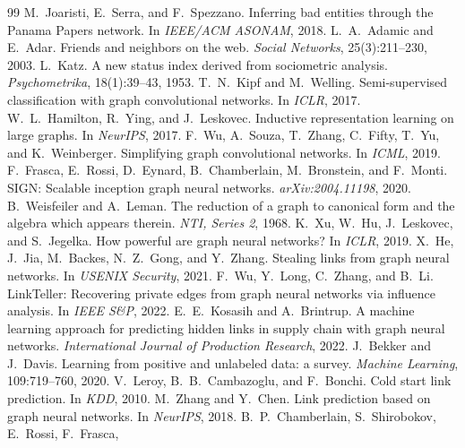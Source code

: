 \documentclass[sigconf]{acmart}
\begin{document}
\begin{thebibliography}{99}
 M.~Joaristi, E.~Serra, and F.~Spezzano.
\newblock Inferring bad entities through the Panama Papers network.
\newblock In \emph{IEEE/ACM ASONAM}, 2018.
 L.~A.~Adamic and E.~Adar.
\newblock Friends and neighbors on the web.
\newblock \emph{Social Networks}, 25(3):211--230, 2003.
 L.~Katz.
\newblock A new status index derived from sociometric analysis.
\newblock \emph{Psychometrika}, 18(1):39--43, 1953.
 T.~N.~Kipf and M.~Welling.
\newblock Semi-supervised classification with graph convolutional networks.
\newblock In \emph{ICLR}, 2017.
 W.~L.~Hamilton, R.~Ying, and J.~Leskovec.
\newblock Inductive representation learning on large graphs.
\newblock In \emph{NeurIPS}, 2017.
 F.~Wu, A.~Souza, T.~Zhang, C.~Fifty, T.~Yu, and K.~Weinberger.
\newblock Simplifying graph convolutional networks.
\newblock In \emph{ICML}, 2019.
 F.~Frasca, E.~Rossi, D.~Eynard, B.~Chamberlain, M.~Bronstein,
and F.~Monti.
\newblock SIGN: Scalable inception graph neural networks.
\newblock \emph{arXiv:2004.11198}, 2020. %
 B.~Weisfeiler and A.~Leman.
\newblock The reduction of a graph to canonical form and the algebra which
appears therein.
\newblock \emph{NTI, Series 2}, 1968.
 K.~Xu, W.~Hu, J.~Leskovec, and S.~Jegelka.
\newblock How powerful are graph neural networks?
\newblock In \emph{ICLR}, 2019.
 X.~He, J.~Jia, M.~Backes, N.~Z.~Gong, and Y.~Zhang.
\newblock Stealing links from graph neural networks.
\newblock In \emph{USENIX Security}, 2021.
 F.~Wu, Y.~Long, C.~Zhang, and B.~Li.
\newblock LinkTeller: Recovering private edges from graph neural networks via
influence analysis.
\newblock In \emph{IEEE S\&P}, 2022.
 E.~E.~Kosasih and A.~Brintrup.
\newblock A machine learning approach for predicting hidden links in supply chain
with graph neural networks.
\newblock \emph{International Journal of Production Research}, 2022.
 J.~Bekker and J.~Davis.
\newblock Learning from positive and unlabeled data: a survey.
\newblock \emph{Machine Learning}, 109:719--760, 2020.
 V.~Leroy, B.~B.~Cambazoglu, and F.~Bonchi.
\newblock Cold start link prediction.
\newblock In \emph{KDD}, 2010. %
 M.~Zhang and Y.~Chen.
\newblock Link prediction based on graph neural networks.
\newblock In \emph{NeurIPS}, 2018.
 B.~P.~Chamberlain, S.~Shirobokov, E.~Rossi, F.~Frasca,

\end{thebibliography}
\end{document}
